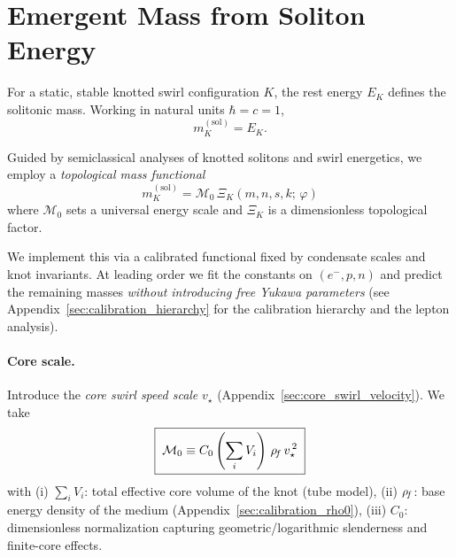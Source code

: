 \section{Emergent Mass from Soliton Energy}
\label{sec:mass-functional}

\providecommand{\rc}{r_c}
\providecommand{\vswirl}{\mathbf{v}_{\mathrm{swirl}}} %
\newcommand{\vstar}{v_\star}                           %

For a static, stable knotted swirl configuration \(K\), the rest energy \(E_K\) defines the solitonic mass.
Working in natural units \(\hbar=c=1\),
\begin{equation}
	m_K^{(\mathrm{sol})} = E_K .
\end{equation}

Guided by semiclassical analyses of knotted solitons \cite{Faddeev1997} and swirl energetics, we employ a \emph{topological mass functional}
\begin{equation}
	\boxed{ \; m_K^{(\mathrm{sol})} = \mathcal{M}_0 \,\Xi_K(m,n,s,k;\,\varphi) \; }
	\label{eq:mass-functional}
\end{equation}
where \(\mathcal{M}_0\) sets a universal energy scale and \(\Xi_K\) is a dimensionless topological factor.

We implement this via a calibrated functional fixed by condensate scales and knot invariants. At leading order we fit the constants on \((e^{-},p,n)\) and predict the remaining masses \emph{without introducing free Yukawa parameters} (see Appendix~\ref{sec:calibration_hierarchy} for the calibration hierarchy and the lepton analysis).

\paragraph{Core scale.}
Introduce the \emph{core swirl speed scale} \(\vstar\) (Appendix~\ref{sec:core_swirl_velocity}). We take
\begin{equation}
	\boxed{ \; \mathcal{M}_0 \equiv C_0 \left(\sum_i V_i\right)\,\rhoF\,\vstar^{\,2} \; }
	\label{eq:M0}
\end{equation}
with
(i) \( \sum_i V_i \): total effective core volume of the knot (tube model),
(ii) \( \rho_{\!f} \): base energy density of the medium (Appendix~\ref{sec:calibration_rho0}),
(iii) \(C_0\): dimensionless normalization capturing geometric/logarithmic slenderness and finite-core effects.

